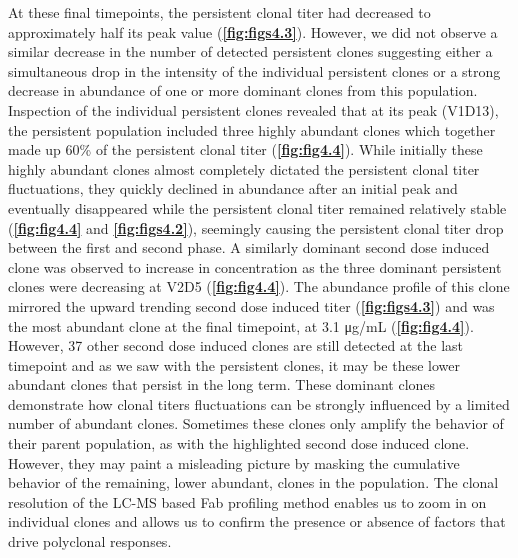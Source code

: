 At these final timepoints, the persistent clonal titer had decreased to approximately half its peak value (\textbf{\autoref{fig:figs4.3}}). However, we did not observe a similar decrease in the number of detected persistent clones suggesting either a simultaneous drop in the intensity of the individual persistent clones or a strong decrease in abundance of one or more dominant clones from this population. Inspection of the individual persistent clones revealed that at its peak (V1D13), the persistent population included three highly abundant clones which together made up 60\% of the persistent clonal titer (\textbf{\autoref{fig:fig4.4}}). While initially these highly abundant clones almost completely dictated the persistent clonal titer fluctuations, they quickly declined in abundance after an initial peak and eventually disappeared while the persistent clonal titer remained relatively stable (\textbf{\autoref{fig:fig4.4}} and \textbf{\autoref{fig:figs4.2}}), seemingly causing the persistent clonal titer drop between the first and second phase.
A similarly dominant second dose induced clone was observed to increase in concentration as the three dominant persistent clones were decreasing at V2D5 (\textbf{\autoref{fig:fig4.4}}). The abundance profile of this clone mirrored the upward trending second dose induced titer (\textbf{\autoref{fig:figs4.3}}) and was the most abundant clone at the final timepoint, at 3.1 μg/mL (\textbf{\autoref{fig:fig4.4}}). However, 37 other second dose induced clones are still detected at the last timepoint and as we saw with the persistent clones, it may be these lower abundant clones that persist in the long term.
These dominant clones demonstrate how clonal titers fluctuations can be strongly influenced by a limited number of abundant clones. Sometimes these clones only amplify the behavior of their parent population, as with the highlighted second dose induced clone. However, they may paint a misleading picture by masking the cumulative behavior of the remaining, lower abundant, clones in the population. The clonal resolution of the LC-MS based Fab profiling method enables us to zoom in on individual clones and allows us to confirm the presence or absence of factors that drive polyclonal responses.


